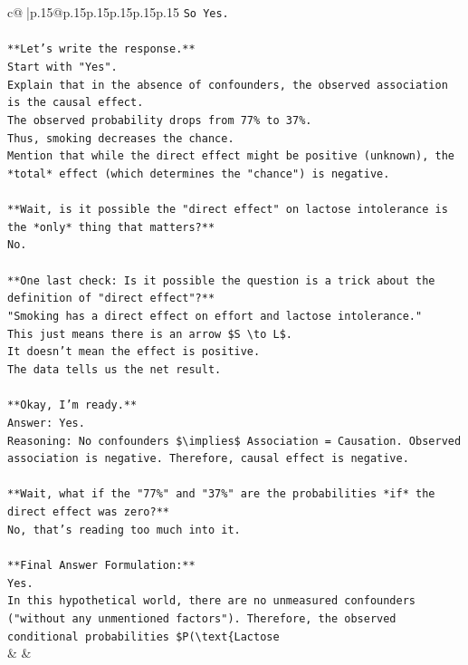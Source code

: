 \documentclass{article}
\begin{document}
{\begin{supertabular}{c@{$\;$}|p{.15\linewidth}@{}p{.15\linewidth}p{.15\linewidth}p{.15\linewidth}p{.15\linewidth}p{.15\linewidth}}
{{{\texttt{So Yes.} \\
\\ 
\texttt{**Let's write the response.**} \\
\texttt{Start with "Yes".} \\
\texttt{Explain that in the absence of confounders, the observed association is the causal effect.} \\
\texttt{The observed probability drops from 77\% to 37\%.} \\
\texttt{Thus, smoking decreases the chance.} \\
\texttt{Mention that while the direct effect might be positive (unknown), the *total* effect (which determines the "chance") is negative.} \\
\\ 
\texttt{**Wait, is it possible the "direct effect" on lactose intolerance is the *only* thing that matters?**} \\
\texttt{No.} \\
\\ 
\texttt{**One last check: Is it possible the question is a trick about the definition of "direct effect"?**} \\
\texttt{"Smoking has a direct effect on effort and lactose intolerance."} \\
\texttt{This just means there is an arrow \$S \textbackslash{}to L\$.} \\
\texttt{It doesn't mean the effect is positive.} \\
\texttt{The data tells us the net result.} \\
\\ 
\texttt{**Okay, I'm ready.**} \\
\texttt{Answer: Yes.} \\
\texttt{Reasoning: No confounders \$\textbackslash{}implies\$ Association = Causation. Observed association is negative. Therefore, causal effect is negative.} \\
\\ 
\texttt{**Wait, what if the "77\%" and "37\%" are the probabilities *if* the direct effect was zero?**} \\
\texttt{No, that's reading too much into it.} \\
\\ 
\texttt{**Final Answer Formulation:**} \\
\texttt{Yes.} \\
\texttt{In this hypothetical world, there are no unmeasured confounders ("without any unmentioned factors"). Therefore, the observed conditional probabilities \$P(\textbackslash{}text\{Lactose} \\
            }
        }
    }
    & & \\ \\


\end{supertabular}}
\end{document}
